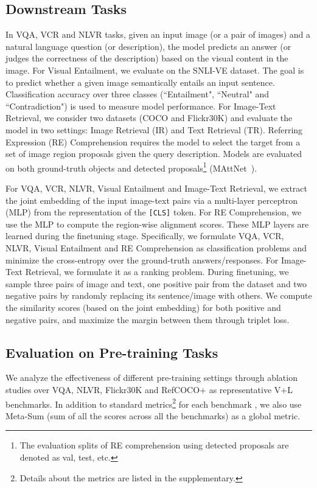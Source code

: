 \documentclass[runningheads]{llncs}
\begin{document}
\subsection{Downstream Tasks}\label{sec:downstream}
In VQA, VCR and NLVR tasks, given an input image (or a pair of images) and a natural language question (or description), the model predicts an answer (or judges the correctness of the description) based on the visual content in the image. 
For Visual Entailment, we evaluate on the SNLI-VE dataset. The goal is to predict whether a given image semantically entails an input sentence. Classification accuracy over three classes (``Entailment", ``Neutral" and ``Contradiction") is used to measure model performance. 
For Image-Text Retrieval, we consider two datasets (COCO and Flickr30K) and evaluate the model in two settings: Image Retrieval (IR) and Text Retrieval (TR).
Referring Expression (RE) Comprehension requires the model to select the target from a set of image region proposals given the query description.
Models are evaluated on both ground-truth objects and detected proposals\footnote{The evaluation splits of RE comprehension using detected proposals are denoted as val, test, etc.} (MAttNet~\cite{yu2018mattnet}).


For VQA, VCR, NLVR, Visual Entailment and Image-Text Retrieval, we extract the joint embedding of the input image-text pairs via a multi-layer perceptron (MLP) from the representation of the \texttt{[CLS]} token. For RE Comprehension, we use the MLP to compute the region-wise alignment scores. These MLP layers are learned during the finetuning stage.
Specifically, we formulate VQA, VCR, NLVR, Visual Entailment and RE Comprehension as classification problems and minimize the cross-entropy over the ground-truth answers/responses. 
For Image-Text Retrieval, we formulate it as a ranking problem. 
During finetuning, we sample three pairs of image and text, one positive pair from the dataset and two negative pairs by randomly replacing its sentence/image with others.
We compute the similarity scores (based on the joint embedding) for both positive and negative pairs, and maximize the margin between them through triplet loss. 

\subsection{Evaluation on Pre-training Tasks}\label{sec:ablation_pretraining}
We analyze the effectiveness of different pre-training settings through ablation studies over VQA, NLVR, Flickr30K and RefCOCO+ as representative V+L benchmarks.
In addition to standard metrics\footnote{Details about the metrics are listed in the supplementary.} for each benchmark
, we also use Meta-Sum (sum of all the scores across all the benchmarks) as a global metric. 
\end{document}
